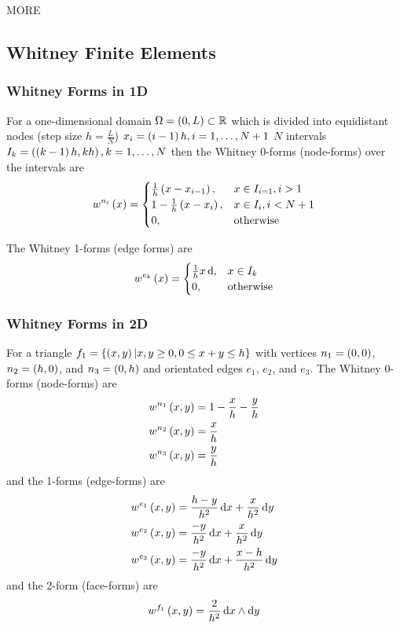 MORE

\subsection{Whitney Finite Elements}

\subsubsection{Whitney Forms in 1D}

For a one-dimensional domain $\Omega=\pbrac{0,L}\subset\rntopology{}$ which is
divided into equidistant nodes (step size $h=\frac{L}{N}$)
$x_{i}=\left( i-1 \right)h, i=1,\ldots,N+1$ \ie $N$ intervals
$I_{k}=\left( \left( k-1 \right)h,kh \right), k=1,\ldots,N$ then the Whitney 0-forms
(node-forms) over the intervals are
\begin{equation}
   w^{n_{i}}\left( x \right)  = \begin{cases}
    \frac{1}{h}\left( x-x_{i-1} \right), & x\in I_{i=1}, i>1 \\
    1-\frac{1}{h}\left( x-x_{i} \right), & x\in I_{i},i<N+1 \\
    0, & \text{otherwise}
  \end{cases}
\end{equation}

The Whitney 1-forms (edge forms) are
\begin{equation}
   w^{e_{k}}\left( x \right)  = \begin{cases}
    \frac{1}{h} x\,  { \mathrm{d} },    & x\in I_{k} \\
    0, & \text{otherwise}
  \end{cases}
\end{equation}

\subsubsection{Whitney Forms in 2D}

For a triangle $f_{1}=\left\{ \left( x,y \right)\vert x,y\ge 0, 0\leq x+y \leq h \right\}$
with vertices $n_{1}=\left( 0,0 \right)$, $n_{2}=\left( h,0 \right)$, and
$n_{3}=\left( 0,h \right)$ and orientated edges $e_{1}$, $e_{2}$, and $e_{3}$. The
Whitney 0-forms (node-forms) are
\begin{align}
   w^{n_{1}}\left( x,y \right)  &= 1-\frac{x}{h}-\frac{y}{h} \\
   w^{n_{2}}\left( x,y \right)  &= \frac{x}{h} \\
   w^{n_{3}}\left( x,y \right)  &= \frac{y}{h}  
\end{align}
and the 1-forms (edge-forms) are
\begin{align}
   w^{e_{1}}\left( x,y \right) &= \frac{h-y}{h^{2}}\,  { \mathrm{d} }x   + \frac{x}{h^{2}}\,  { \mathrm{d} }y   \\
   w^{e_{2}}\left( x,y \right) &= \frac{-y}{h^{2}}\,  { \mathrm{d} }x   + \frac{x}{h^{2}}\,  { \mathrm{d} }y   \\
   w^{e_{3}}\left( x,y \right) &= \frac{-y}{h^{2}}\,  { \mathrm{d} }x   + \frac{x-h}{h^{2}}\,  { \mathrm{d} }y   
\end{align}
and the 2-form (face-forms) are
\begin{equation}
   w^{f_{1}}\left( x,y \right) = \frac{2}{h^{2}}\,   { \mathrm{d} }x   \wedge   {\ensuremath{ \mathrm{d} }}y    
\end{equation}

 
